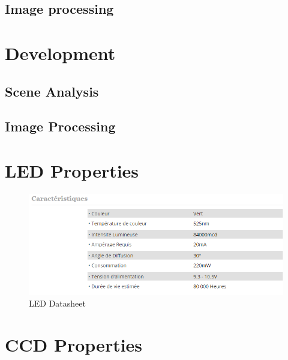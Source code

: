 \documentclass[12pt,a4paper,fleqn, onesside]{report}
\begin{document}
\section{Image processing}


\chapter{Development}
\section{Scene Analysis}


\section{Image Processing}



\appendix
\chapter{LED Properties}
\label{LEDdatasheet}
\begin{figure}[h]
  \centerline{\includegraphics[scale=0.8]{fig/LedDataSheet.png}}
  \caption{LED Datasheet}
  \label{fig:LEDdatasheet}
\end{figure}

\chapter{CCD Properties}
\label{CCDdatasheet}





\end{document}
